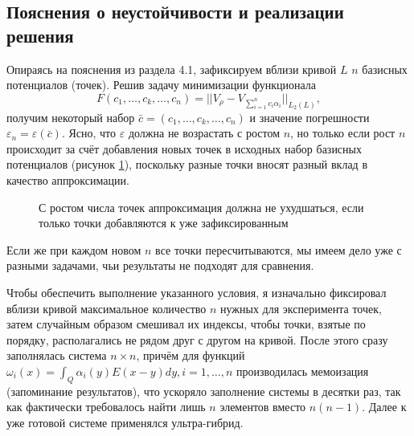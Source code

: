 \documentclass[a4paper, 12pt]{article}
\newcommand{\V}[1]{\int_Q #1(y) E(x-y) dy}
\begin{document}
\subsection{Пояснения о неустойчивости и реализации решения}
Опираясь на пояснения из раздела 4.1, зафиксируем вблизи кривой $L$ $n$ базисных потенциалов (точек).
Решив задачу минимизации функционала
\begin{equation*}
  F(c_1,\dots,c_k,\dots,c_n)=||V_{\rho}-V_{\sum_{i=1}^n c_i \alpha_i}||_{L_2(L)},
\end{equation*}
получим некоторый набор $\bar c=(c_1,\dots,c_k,\dots,c_n)$ и значение погрешности $\varepsilon_n = \varepsilon (\bar c)$.
Ясно, что $\varepsilon$ должна не возрастать с ростом $n$, но только если рост $n$ происходит за счёт добавления новых точек в исходных набор базисных потенциалов (рисунок \ref{points2}),
поскольку разные точки вносят разный вклад в качество аппроксимации.
\begin{figure}[h!]
  \noindent{}
  \caption{С ростом числа точек аппроксимация должна не ухудшаться, если только точки добавляются к уже зафиксированным}
  \label{points2}
  \end{figure} 

Если же при каждом новом $n$ все точки пересчитываются, мы имеем дело уже с разными задачами, чьи результаты не подходят для сравнения.

Чтобы обеспечить выполнение указанного условия, я изначально фиксировал вблизи кривой максимальное количество $n$ нужных для эксперимента точек,
затем случайным образом смешивал их индексы, чтобы точки, взятые по порядку, располагались не рядом друг с другом на кривой.
После этого сразу заполнялась система $n \times n$, причём для функций $\omega_i(x) =\V{\alpha_i}, i=1,\dots,n$ производилась мемоизация (запоминание результатов), что ускоряло заполнение системы в десятки раз, так как
фактически требовалось найти лишь $n$ элементов вместо $n(n-1)$.
Далее к уже готовой системе применялся ультра-гибрид.
\end{document}
